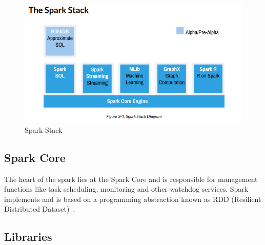 


\begin{figure}[!ht]
  \centering\includegraphics[width=\columnwidth]{images/spark-stack.png}
   \caption{Spark Stack 
   ~\cite{hid-sp18-410-spark-architecture}}\label{fig:spark-stack}
\end{figure}




\subsection{Spark Core}

The heart of the spark lies at the Spark Core and is responsible for management 
functions like task scheduling, monitoring and other watchdog services. 
Spark implements and is based on a programming abstraction known as 
RDD (Resilient Distributed Dataset)~\cite{hid-sp18-410-spark-architecture}.

\subsection{Libraries}

